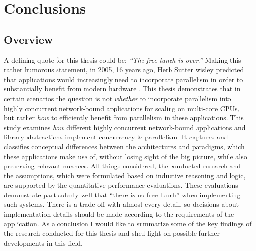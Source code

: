 \chapter{Conclusions}
\section{Overview}
A defining quote for this thesis could be: \textit{“The free lunch is over.” } \linebreak
Making this rather humorous statement, in 2005, 16 years ago, Herb Sutter wisley predicted that applications would increasingly need to incorporate parallelism in order to substantially benefit from modern hardware \cite{sutter:free_lunch}. \newline 
This thesis demonstrates that in certain scenarios the question is not \textit{whether} to incorporate parallelism into highly concurrent network-bound applications for scaling on multi-core CPUs, but rather \textit{how} to efficiently benefit from parallelism in these applications.
This study examines \textit{how} different highly concurrent network-bound applications and library abstractions implement concurrency \& parallelism. It captures and classifies conceptual differences between the architectures and paradigms, which these applications make use of, without losing sight of the big picture, while also preserving relevant nuances.
All things considered, the conducted research and the assumptions, which were formulated based on inductive reasoning and logic, are supported by the quantitative performance evaluations. These evaluations demonstrate particularly well that “there is no free lunch” when implementing such systems. There is a trade-off with almost every detail, so decisions about implementation details should be made according to the requirements of the application. \newline
As a conclusion I would like to summarize some of the key findings of the research conducted for this thesis and shed light on possible further developments in this field.

